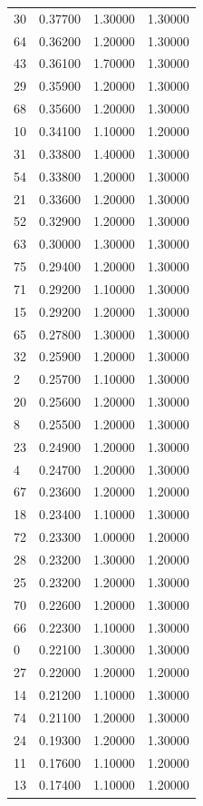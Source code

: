 \begin{tabular}{lrrr}
30 & 0.37700 & 1.30000 & 1.30000 \\
64 & 0.36200 & 1.20000 & 1.30000 \\
43 & 0.36100 & 1.70000 & 1.30000 \\
29 & 0.35900 & 1.20000 & 1.30000 \\
68 & 0.35600 & 1.20000 & 1.30000 \\
10 & 0.34100 & 1.10000 & 1.20000 \\
31 & 0.33800 & 1.40000 & 1.30000 \\
54 & 0.33800 & 1.20000 & 1.30000 \\
21 & 0.33600 & 1.20000 & 1.30000 \\
52 & 0.32900 & 1.20000 & 1.30000 \\
63 & 0.30000 & 1.30000 & 1.30000 \\
75 & 0.29400 & 1.20000 & 1.30000 \\
71 & 0.29200 & 1.10000 & 1.30000 \\
15 & 0.29200 & 1.20000 & 1.30000 \\
65 & 0.27800 & 1.30000 & 1.30000 \\
32 & 0.25900 & 1.20000 & 1.30000 \\
2 & 0.25700 & 1.10000 & 1.30000 \\
20 & 0.25600 & 1.20000 & 1.30000 \\
8 & 0.25500 & 1.20000 & 1.30000 \\
23 & 0.24900 & 1.20000 & 1.30000 \\
4 & 0.24700 & 1.20000 & 1.30000 \\
67 & 0.23600 & 1.20000 & 1.20000 \\
18 & 0.23400 & 1.10000 & 1.30000 \\
72 & 0.23300 & 1.00000 & 1.20000 \\
28 & 0.23200 & 1.30000 & 1.20000 \\
25 & 0.23200 & 1.20000 & 1.30000 \\
70 & 0.22600 & 1.20000 & 1.30000 \\
66 & 0.22300 & 1.10000 & 1.30000 \\
0 & 0.22100 & 1.30000 & 1.30000 \\
27 & 0.22000 & 1.20000 & 1.20000 \\
14 & 0.21200 & 1.10000 & 1.30000 \\
74 & 0.21100 & 1.20000 & 1.30000 \\
24 & 0.19300 & 1.20000 & 1.30000 \\
11 & 0.17600 & 1.10000 & 1.20000 \\
13 & 0.17400 & 1.10000 & 1.20000 \\

\end{tabular}
